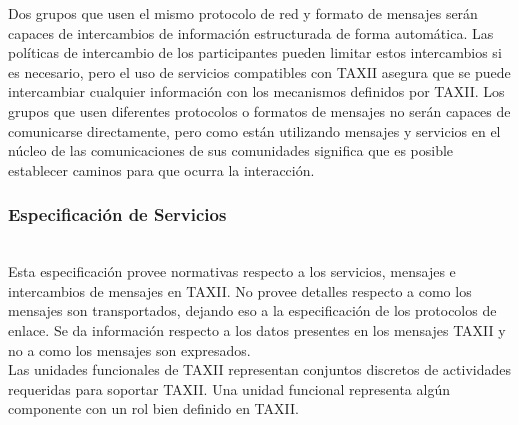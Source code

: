 Dos grupos que usen el mismo protocolo de red y formato de mensajes serán 
capaces de intercambios de información estructurada de forma automática. Las 
políticas de intercambio de los participantes pueden limitar estos intercambios 
si es necesario, pero el uso de servicios compatibles con TAXII asegura que se 
puede intercambiar cualquier información con los mecanismos definidos por TAXII. 
Los grupos que usen diferentes protocolos o formatos de mensajes no serán 
capaces de comunicarse directamente, pero como están utilizando mensajes y 
servicios en el núcleo de las comunicaciones de sus comunidades significa que es 
posible establecer caminos para que ocurra la interacción.

\subsubsection{Especificación de Servicios}\ \\

Esta especificación provee normativas respecto a los servicios, mensajes e 
intercambios de mensajes en TAXII. No provee detalles respecto a como los 
mensajes son transportados, dejando eso a la especificación de los protocolos de 
enlace. Se da información respecto a los datos presentes en los mensajes TAXII y 
no a como los mensajes son expresados.\\

Las unidades funcionales de TAXII representan conjuntos discretos de actividades 
requeridas para soportar TAXII. Una unidad funcional representa algún componente 
con un rol bien definido en TAXII.

